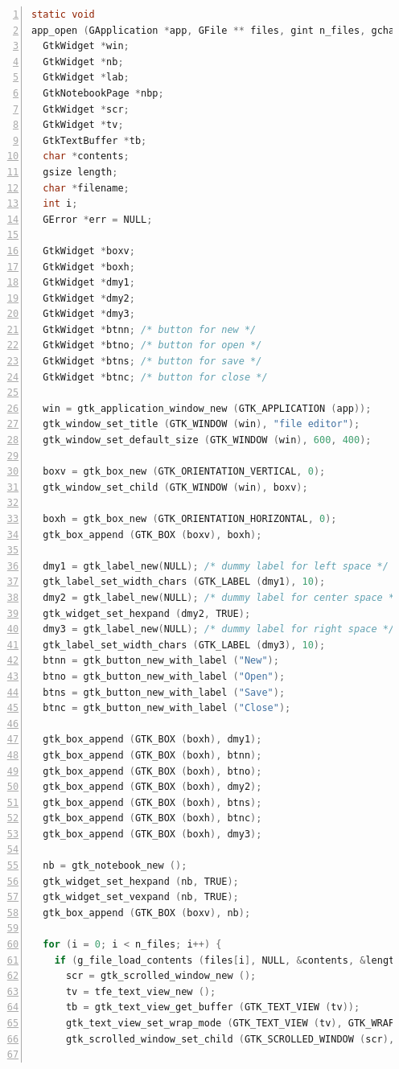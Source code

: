 \begin{lstlisting}[language=C, numbers=left]
static void
app_open (GApplication *app, GFile ** files, gint n_files, gchar *hint) {
  GtkWidget *win;
  GtkWidget *nb;
  GtkWidget *lab;
  GtkNotebookPage *nbp;
  GtkWidget *scr;
  GtkWidget *tv;
  GtkTextBuffer *tb;
  char *contents;
  gsize length;
  char *filename;
  int i;
  GError *err = NULL;

  GtkWidget *boxv;
  GtkWidget *boxh;
  GtkWidget *dmy1;
  GtkWidget *dmy2;
  GtkWidget *dmy3;
  GtkWidget *btnn; /* button for new */
  GtkWidget *btno; /* button for open */
  GtkWidget *btns; /* button for save */
  GtkWidget *btnc; /* button for close */

  win = gtk_application_window_new (GTK_APPLICATION (app));
  gtk_window_set_title (GTK_WINDOW (win), "file editor");
  gtk_window_set_default_size (GTK_WINDOW (win), 600, 400);

  boxv = gtk_box_new (GTK_ORIENTATION_VERTICAL, 0);
  gtk_window_set_child (GTK_WINDOW (win), boxv);

  boxh = gtk_box_new (GTK_ORIENTATION_HORIZONTAL, 0);
  gtk_box_append (GTK_BOX (boxv), boxh);

  dmy1 = gtk_label_new(NULL); /* dummy label for left space */
  gtk_label_set_width_chars (GTK_LABEL (dmy1), 10);
  dmy2 = gtk_label_new(NULL); /* dummy label for center space */
  gtk_widget_set_hexpand (dmy2, TRUE);
  dmy3 = gtk_label_new(NULL); /* dummy label for right space */
  gtk_label_set_width_chars (GTK_LABEL (dmy3), 10);
  btnn = gtk_button_new_with_label ("New");
  btno = gtk_button_new_with_label ("Open");
  btns = gtk_button_new_with_label ("Save");
  btnc = gtk_button_new_with_label ("Close");

  gtk_box_append (GTK_BOX (boxh), dmy1);
  gtk_box_append (GTK_BOX (boxh), btnn);
  gtk_box_append (GTK_BOX (boxh), btno);
  gtk_box_append (GTK_BOX (boxh), dmy2);
  gtk_box_append (GTK_BOX (boxh), btns);
  gtk_box_append (GTK_BOX (boxh), btnc);
  gtk_box_append (GTK_BOX (boxh), dmy3);

  nb = gtk_notebook_new ();
  gtk_widget_set_hexpand (nb, TRUE);
  gtk_widget_set_vexpand (nb, TRUE);
  gtk_box_append (GTK_BOX (boxv), nb);

  for (i = 0; i < n_files; i++) {
    if (g_file_load_contents (files[i], NULL, &contents, &length, NULL, &err)) {
      scr = gtk_scrolled_window_new ();
      tv = tfe_text_view_new ();
      tb = gtk_text_view_get_buffer (GTK_TEXT_VIEW (tv));
      gtk_text_view_set_wrap_mode (GTK_TEXT_VIEW (tv), GTK_WRAP_WORD_CHAR);
      gtk_scrolled_window_set_child (GTK_SCROLLED_WINDOW (scr), tv);


\end{lstlisting}
